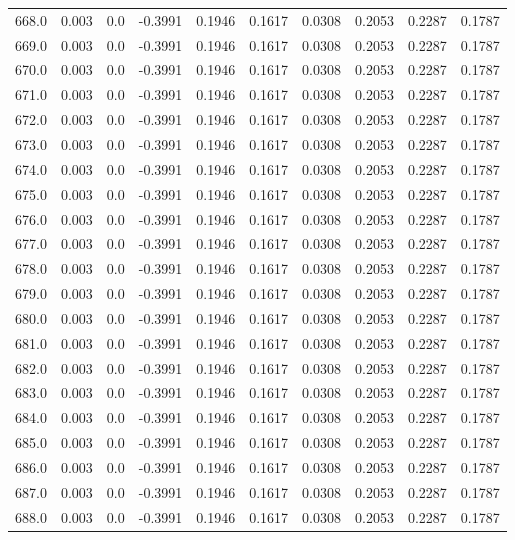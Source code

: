 \begin{longtable}{lrrrrrrrrr}
668.0 & 0.003 & 0.0 & -0.3991 & 0.1946 & 0.1617 & 0.0308 & 0.2053 & 0.2287 & 0.1787 \\
669.0 & 0.003 & 0.0 & -0.3991 & 0.1946 & 0.1617 & 0.0308 & 0.2053 & 0.2287 & 0.1787 \\
670.0 & 0.003 & 0.0 & -0.3991 & 0.1946 & 0.1617 & 0.0308 & 0.2053 & 0.2287 & 0.1787 \\
671.0 & 0.003 & 0.0 & -0.3991 & 0.1946 & 0.1617 & 0.0308 & 0.2053 & 0.2287 & 0.1787 \\
672.0 & 0.003 & 0.0 & -0.3991 & 0.1946 & 0.1617 & 0.0308 & 0.2053 & 0.2287 & 0.1787 \\
673.0 & 0.003 & 0.0 & -0.3991 & 0.1946 & 0.1617 & 0.0308 & 0.2053 & 0.2287 & 0.1787 \\
674.0 & 0.003 & 0.0 & -0.3991 & 0.1946 & 0.1617 & 0.0308 & 0.2053 & 0.2287 & 0.1787 \\
675.0 & 0.003 & 0.0 & -0.3991 & 0.1946 & 0.1617 & 0.0308 & 0.2053 & 0.2287 & 0.1787 \\
676.0 & 0.003 & 0.0 & -0.3991 & 0.1946 & 0.1617 & 0.0308 & 0.2053 & 0.2287 & 0.1787 \\
677.0 & 0.003 & 0.0 & -0.3991 & 0.1946 & 0.1617 & 0.0308 & 0.2053 & 0.2287 & 0.1787 \\
678.0 & 0.003 & 0.0 & -0.3991 & 0.1946 & 0.1617 & 0.0308 & 0.2053 & 0.2287 & 0.1787 \\
679.0 & 0.003 & 0.0 & -0.3991 & 0.1946 & 0.1617 & 0.0308 & 0.2053 & 0.2287 & 0.1787 \\
680.0 & 0.003 & 0.0 & -0.3991 & 0.1946 & 0.1617 & 0.0308 & 0.2053 & 0.2287 & 0.1787 \\
681.0 & 0.003 & 0.0 & -0.3991 & 0.1946 & 0.1617 & 0.0308 & 0.2053 & 0.2287 & 0.1787 \\
682.0 & 0.003 & 0.0 & -0.3991 & 0.1946 & 0.1617 & 0.0308 & 0.2053 & 0.2287 & 0.1787 \\
683.0 & 0.003 & 0.0 & -0.3991 & 0.1946 & 0.1617 & 0.0308 & 0.2053 & 0.2287 & 0.1787 \\
684.0 & 0.003 & 0.0 & -0.3991 & 0.1946 & 0.1617 & 0.0308 & 0.2053 & 0.2287 & 0.1787 \\
685.0 & 0.003 & 0.0 & -0.3991 & 0.1946 & 0.1617 & 0.0308 & 0.2053 & 0.2287 & 0.1787 \\
686.0 & 0.003 & 0.0 & -0.3991 & 0.1946 & 0.1617 & 0.0308 & 0.2053 & 0.2287 & 0.1787 \\
687.0 & 0.003 & 0.0 & -0.3991 & 0.1946 & 0.1617 & 0.0308 & 0.2053 & 0.2287 & 0.1787 \\
688.0 & 0.003 & 0.0 & -0.3991 & 0.1946 & 0.1617 & 0.0308 & 0.2053 & 0.2287 & 0.1787 \\

\end{longtable}
